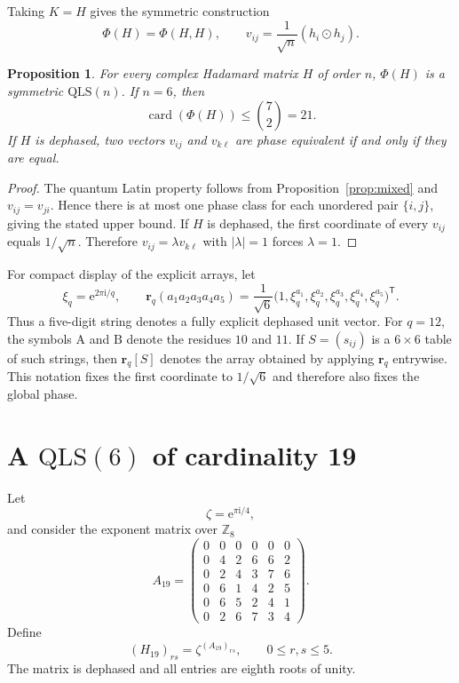 \documentclass[11pt,a4paper]{article}
\newcommand{\Z}{\mathbb{Z}}
\newcommand{\QLS}{\mathrm{QLS}}
\newcommand{\card}{\operatorname{card}}
\newcommand{\od}{\mathbin{\odot}}
\newcommand{\ii}{\mathrm{i}}
\newcommand{\e}{\mathrm{e}}
\newtheorem{proposition}{Proposition}
\begin{document}
Taking $K=H$ gives the symmetric construction
\[
  \Phi(H)=\Phi(H,H),
  \qquad
  v_{ij}=\frac1{\sqrt n}(h_i\od h_j).
\]

\begin{proposition}\label{prop:symmetric}
For every complex Hadamard matrix $H$ of order $n$, $\Phi(H)$ is a symmetric
$\QLS(n)$.  If $n=6$, then
\[
  \card(\Phi(H))\leq\binom{7}{2}=21.
\]
If $H$ is dephased, two vectors $v_{ij}$ and $v_{k\ell}$ are phase equivalent
if and only if they are equal.
\end{proposition}

\begin{proof}
The quantum Latin property follows from Proposition~\ref{prop:mixed} and
$v_{ij}=v_{ji}$.  Hence there is at most one phase class for each unordered
pair $\{i,j\}$, giving the stated upper bound.  If $H$ is dephased, the first
coordinate of every $v_{ij}$ equals $1/\sqrt n$.  Therefore
$v_{ij}=\lambda v_{k\ell}$ with $|\lambda|=1$ forces $\lambda=1$.
\end{proof}

For compact display of the explicit arrays, let
\[
 \xi_q=\e^{2\pi\ii/q},
 \qquad
 \mathbf r_q(a_1a_2a_3a_4a_5)
 =
 \frac1{\sqrt6}
 \bigl(1,\xi_q^{a_1},\xi_q^{a_2},\xi_q^{a_3},
       \xi_q^{a_4},\xi_q^{a_5}\bigr)^{\mathsf T}.
\]
Thus a five-digit string denotes a fully explicit dephased unit vector.
For $q=12$, the symbols $\mathrm A$ and $\mathrm B$ denote the residues
$10$ and $11$.  If $S=(s_{ij})$ is a $6\times6$ table of such strings, then
$\mathbf r_q[S]$ denotes the array obtained by applying $\mathbf r_q$
entrywise.  This notation fixes the first coordinate to $1/\sqrt6$ and
therefore also fixes the global phase.

\section{A \texorpdfstring{$\QLS(6)$}{QLS(6)} of cardinality 19}\label{sec:c19}

Let
\[
  \zeta=\e^{\pi\ii/4},
\]
and consider the exponent matrix over $\Z_8$
\begin{equation}\label{eq:A19}
A_{19}=
\begin{pmatrix}
0&0&0&0&0&0\\
0&4&2&6&6&2\\
0&2&4&3&7&6\\
0&6&1&4&2&5\\
0&6&5&2&4&1\\
0&2&6&7&3&4
\end{pmatrix}.
\end{equation}
Define
\begin{equation}\label{eq:H19}
  (H_{19})_{rs}=\zeta^{(A_{19})_{rs}},
  \qquad 0\leq r,s\leq5.
\end{equation}
The matrix is dephased and all entries are eighth roots of unity.
\end{document}
